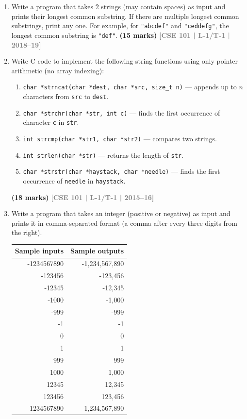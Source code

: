 \documentclass[12pt,a3paper]{article}
\newcommand{\yr}[1]{\hfill\textcolor{gray}{\small\textbf{[#1]}}}
\newcommand{\mk}[1]{\textcolor{orange!70!black}{\small\textbf{(#1 marks)}}}
\begin{document}
\begin{enumerate}
\item Write a program that takes 2 strings (may contain spaces) as input and prints their longest common substring. If there are multiple longest common substrings, print any one. For example, for \texttt{"abcdef"} and \texttt{"ceddefg"}, the longest common substring is \texttt{"def"}.
\mk{15} \yr{CSE 101 | L-1/T-1 | 2018--19}

\item Write C code to implement the following string functions using only pointer arithmetic (no array indexing):
\begin{enumerate}
  \item \texttt{char *strncat(char *dest, char *src, size\_t n)} --- appends up to $n$ characters from \texttt{src} to \texttt{dest}.
  \item \texttt{char *strchr(char *str, int c)} --- finds the first occurrence of character \texttt{c} in \texttt{str}.
  \item \texttt{int strcmp(char *str1, char *str2)} --- compares two strings.
  \item \texttt{int strlen(char *str)} --- returns the length of \texttt{str}.
  \item \texttt{char *strstr(char *haystack, char *needle)} --- finds the first occurrence of \texttt{needle} in \texttt{haystack}.
\end{enumerate}
\mk{18} \yr{CSE 101 | L-1/T-1 | 2015--16}

\item Write a program that takes an integer (positive or negative) as input and prints it in comma-separated format (a comma after every three digits from the right).
\begin{center}
\begin{tabular}{rr}
\hline
\textbf{Sample inputs} & \textbf{Sample outputs} \\
\hline
-1234567890 & -1,234,567,890 \\
-123456     & -123,456       \\
-12345      & -12,345        \\
-1000       & -1,000         \\
-999        & -999           \\
-1          & -1             \\
0           & 0              \\
1           & 1              \\
999         & 999            \\
1000        & 1,000          \\
12345       & 12,345         \\
123456      & 123,456        \\
1234567890  & 1,234,567,890  \\
\hline
\end{tabular}
\end{center}


\end{enumerate}
\end{document}
